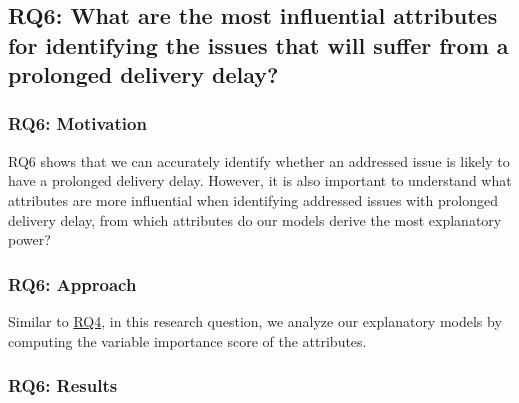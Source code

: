 
\subsection{RQ6: What are the most influential attributes for                        
	identifying the issues that will suffer from a prolonged delivery delay?}\label{ch4:rq6}                                                                    
                                                                                    
\subsubsection*{RQ6: Motivation} RQ6 shows that we can accurately                    
identify whether an addressed issue is likely to have a prolonged delivery delay.         
However, it is also important to understand what attributes are more influential    
when identifying addressed issues with prolonged delivery delay, \ie from which attributes 
do our models derive the most explanatory power?                                    
                                                                                    
\subsubsection*{RQ6: Approach} Similar to \hyperref[ch4:rq4]{RQ4}, in this research
question, we analyze our explanatory models by computing the variable importance
score of the attributes.                                                                         

\subsubsection*{RQ6: Results}

